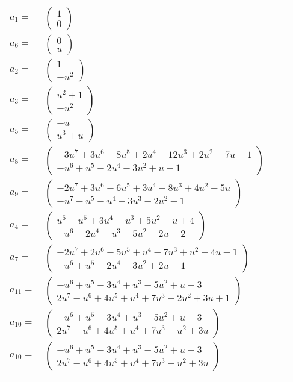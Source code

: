 \documentclass[1p]{elsarticle_modified}
\theoremstyle{definition}
\begin{document}
\begin{tabular}{m{7pt} m{180pt} m{7pt} m{180pt} }
\flushright $a_{1}=$&$\begin{pmatrix}1\\0\end{pmatrix}$ \\
\flushright $a_{6}=$&$\begin{pmatrix}0\\u\end{pmatrix}$ \\
\flushright $a_{2}=$&$\begin{pmatrix}1\\- u^2\end{pmatrix}$ \\
\flushright $a_{3}=$&$\begin{pmatrix}u^2+1\\- u^2\end{pmatrix}$ \\
\flushright $a_{5}=$&$\begin{pmatrix}- u\\u^3+u\end{pmatrix}$ \\
\flushright $a_{8}=$&$\begin{pmatrix}-3 u^7+3 u^6-8 u^5+2 u^4-12 u^3+2 u^2-7 u-1\\- u^6+u^5-2 u^4-3 u^2+u-1\end{pmatrix}$ \\
\flushright $a_{9}=$&$\begin{pmatrix}-2 u^7+3 u^6-6 u^5+3 u^4-8 u^3+4 u^2-5 u\\- u^7- u^5- u^4-3 u^3-2 u^2-1\end{pmatrix}$ \\
\flushright $a_{4}=$&$\begin{pmatrix}u^6- u^5+3 u^4- u^3+5 u^2- u+4\\- u^6-2 u^4- u^3-5 u^2-2 u-2\end{pmatrix}$ \\
\flushright $a_{7}=$&$\begin{pmatrix}-2 u^7+2 u^6-5 u^5+u^4-7 u^3+u^2-4 u-1\\- u^6+u^5-2 u^4-3 u^2+2 u-1\end{pmatrix}$ \\
\flushright $a_{11}=$&$\begin{pmatrix}- u^6+u^5-3 u^4+u^3-5 u^2+u-3\\2 u^7- u^6+4 u^5+u^4+7 u^3+2 u^2+3 u+1\end{pmatrix}$ \\
\flushright $a_{10}=$&$\begin{pmatrix}- u^6+u^5-3 u^4+u^3-5 u^2+u-3\\2 u^7- u^6+4 u^5+u^4+7 u^3+u^2+3 u\end{pmatrix}$\\ \flushright $a_{10}=$&$\begin{pmatrix}- u^6+u^5-3 u^4+u^3-5 u^2+u-3\\2 u^7- u^6+4 u^5+u^4+7 u^3+u^2+3 u\end{pmatrix}$\\&\end{tabular}
\end{document}
